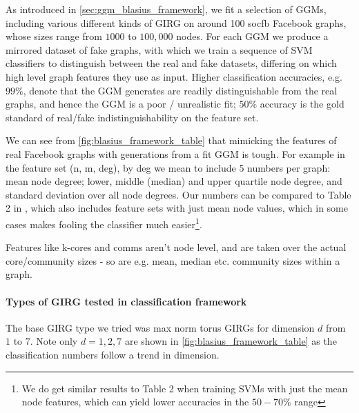 As introduced in \cref{sec:ggm_blasius_framework}, we fit a selection of GGMs, including various different kinds of GIRG on around 100 socfb Facebook graphs, whose sizes range from $1000$ to $100,000$ nodes. For each GGM we produce a mirrored dataset of fake graphs, with which we train a sequence of SVM classifiers to distinguish between the real and fake datasets, differing on which high level graph features they use as input. Higher classification accuracies, e.g. $99\%$, denote that the GGM generates are readily distinguishable from the real graphs, and hence the GGM is a poor / unrealistic fit; $50\%$ accuracy is the gold standard of real/fake indistinguishability on the feature set.

We can see from \cref{fig:blasius_framework_table} that mimicking the features of real Facebook graphs with generations from a fit GGM is tough. For example in the feature set (n, m, deg), by deg we mean to include 5 numbers per graph: mean node degree; lower, middle (median) and upper quartile node degree, and standard deviation over all node degrees. Our numbers can be compared to Table 2 in \cite{blasius2018towards}, which also includes feature sets with just mean node values, which in some cases makes fooling the classifier much easier\footnote{We do get similar results to Table 2 when training SVMs with just the mean node features, which can yield lower accuracies in the $50-70\%$ range}.

Features like k-cores and comms aren't node level, and are taken over the actual core/community sizes - so are e.g. mean, median etc. community sizes within a graph.


\paragraph{Types of GIRG tested in classification framework} The base GIRG type we tried was max norm torus GIRGs for dimension $d$ from $1$ to $7$. Note only $d=1, 2, 7$ are shown in \cref{fig:blasius_framework_table} as the classification numbers follow a trend in dimension.

